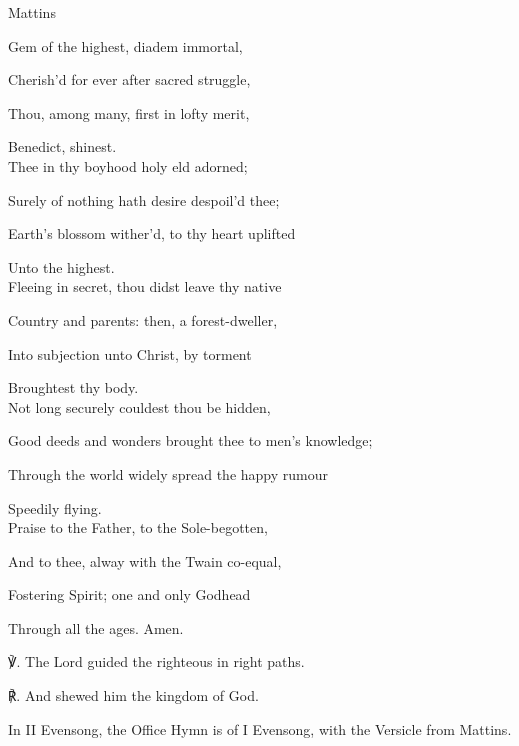 \begin{paracol}{2}[]
	\switchcolumn
	
\begin{inhead}
	Mattins
\end{inhead}
\begin{hangparas}{1.25em}{1}
Gem of the highest, diadem immortal,

Cherish'd for ever after sacred struggle,

Thou, among many, first in lofty merit,

Benedict, shinest.\\

Thee in thy boyhood holy eld adorned;

Surely of nothing hath desire despoil'd thee;

Earth's blossom wither'd, to thy heart uplifted

Unto the highest.\\

Fleeing in secret, thou didst leave thy native

Country and parents: then, a forest-dweller,

Into subjection unto Christ, by torment

Broughtest thy body.\\

Not long securely couldest thou be hidden,

Good deeds and wonders brought thee to men's knowledge;

Through the world widely spread the happy rumour

Speedily flying.\\

Praise to the Father, to the Sole-begotten,

And to thee, alway with the Twain co-equal,

Fostering Spirit; one and only Godhead

Through all the ages. Amen.\\
\end{hangparas}

    ℣. The Lord guided the righteous in right paths.

	℟. And shewed him the kingdom of God.

\fussy
\end{paracol}

\begin{rubric}
	In II Evensong, the Office Hymn is of I Evensong, with the Versicle from Mattins.
\end{rubric}



